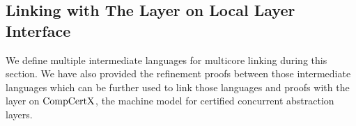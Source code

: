 
\subsection{Linking with The Layer on Local Layer Interface}
\label{chapter:linking:subsec:linking-with-the-layer-on-local-layer-interface}


We define multiple intermediate languages for multicore linking during this section.
We have also provided the refinement proofs between those intermediate languages which can be further used to link those languages and proofs with the layer on $\mathrm{CompCertX}$, the machine model for certified concurrent abstraction layers. 
